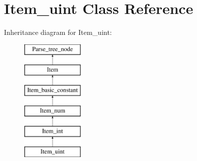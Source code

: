 \hypertarget{classItem__uint}{}\section{Item\+\_\+uint Class Reference}
\label{classItem__uint}
Inheritance diagram for Item\+\_\+uint\+:\begin{figure}[H]
\begin{center}
\leavevmode
\includegraphics[height=6.000000cm]{classItem__uint}
\end{center}
\end{figure}
